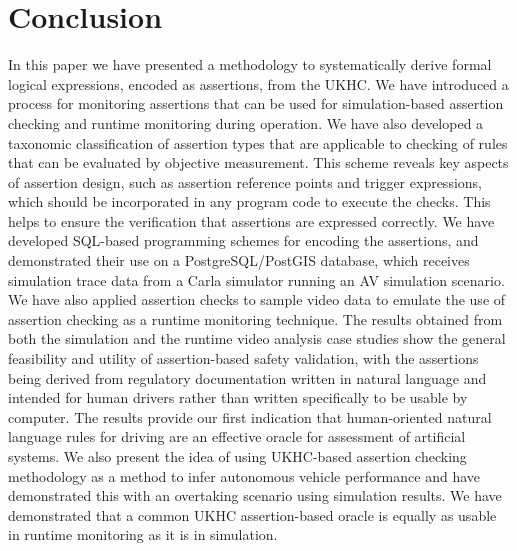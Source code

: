 \section{Conclusion}\label{conclusion}

In this paper we have presented a methodology to systematically derive formal logical expressions, encoded as assertions, from the UKHC. We have introduced a process for monitoring assertions that can be used for simulation-based assertion checking and runtime monitoring during operation.
We have also developed a taxonomic classification of assertion types that are applicable to checking of rules that can be evaluated by objective measurement. This scheme reveals key aspects of assertion design, such as assertion reference points and trigger expressions, which should be incorporated in any program code to execute the checks. This helps to ensure the verification that assertions are expressed correctly. We have developed SQL-based programming schemes for encoding the assertions, and demonstrated their use on a PostgreSQL/PostGIS database, which receives simulation trace data from a Carla simulator running an AV simulation scenario. We have also applied assertion checks to sample video data to emulate the use of assertion checking as a runtime monitoring technique.
The results obtained from both the simulation and the runtime video analysis case studies show the general feasibility and utility of assertion-based safety validation, with the assertions being derived from regulatory documentation written in natural language and intended for human drivers rather than written specifically to be usable by computer. The results provide our first indication that human-oriented natural language rules for driving are an effective oracle for assessment of artificial systems. %
We also present the idea of using UKHC-based assertion checking methodology as a method to infer autonomous vehicle performance and have demonstrated this with an overtaking scenario using simulation results. We have demonstrated that a common UKHC assertion-based oracle is equally as usable in runtime monitoring as it is in simulation.

